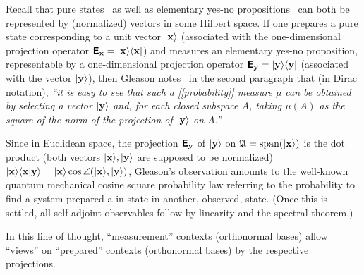 Recall that pure states~\cite{Dirac621,dirac}
as well as elementary yes-no propositions~\cite{v-neumann-49,v-neumann-55,birkhoff-36} can both
be represented by (normalized) vectors in some Hilbert space.
If one prepares a pure state corresponding to a unit vector
$\vert {\bf x} \rangle$ (associated with the one-dimensional projection operator
$\textsf{\textbf{E}}_{\bf x}=\vert {\bf x} \rangle \langle {\bf x} \vert $)
and measures an elementary yes-no proposition, representable by a one-dimensional projection operator
$\textsf{\textbf{E}}_{\bf y}=\vert {\bf y} \rangle \langle {\bf y} \vert $
(associated with the vector
$\vert {\bf y} \rangle$),
then Gleason notes~\cite[p.~885]{Gleason} in the second paragraph that (in Dirac notation),
{\em  ``it is easy to see that such a [[probability]] measure $\mu$
can be obtained by selecting a vector $\vert {\bf y} \rangle$
and, for each closed subspace $A$, taking $\mu ({A})$ as the square of the norm of the
projection %
of $\vert {\bf y} \rangle$  on ${A}$.''}

Since in Euclidean space, the
projection $\textsf{\textbf{E}}_{\bf y}$
of $\vert {\bf y} \rangle$  on $\mathfrak{A} = \text{span} (\vert {\bf x} \rangle)$
is the dot product  (both vectors $\vert {\bf x} \rangle , \vert {\bf y} \rangle$
are supposed to be normalized)
$
\vert {\bf x} \rangle  \langle {\bf x} \vert {\bf y} \rangle  =
\vert {\bf x} \rangle  \cos \angle (\vert {\bf x} \rangle , \vert {\bf y} \rangle )
$,
Gleason's observation amounts to the well-known quantum mechanical cosine square probability law
referring to the probability to find a system prepared a in state in another, observed, state.
(Once this is settled, all self-adjoint observables follow by linearity and the spectral theorem.)

In this line of thought, ``measurement'' contexts (orthonormal bases)
allow ``views'' on  ``prepared'' contexts (orthonormal bases)
by the respective projections.




